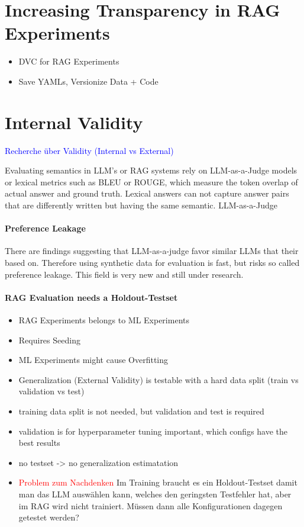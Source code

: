 \section{Increasing Transparency in RAG Experiments}

\begin{itemize}
    \item DVC for RAG Experiments
    \item Save YAMLs, Versionize Data + Code
\end{itemize}

\section{Internal Validity}

\textcolor{blue}{Recherche über Validity (Internal vs External)}


Evaluating semantics in LLM's or RAG systems rely on LLM-as-a-Judge models or lexical metrics such as BLEU or ROUGE, which measure the token overlap of actual answer and ground truth. Lexical answers can not capture answer pairs that are differently written but having the same semantic. LLM-as-a-Judge 

\paragraph{Preference Leakage}
There are findings suggesting that LLM-as-a-judge favor similar LLMs that their based on. Therefore using synthetic data for evaluation is fast, but risks so called preference leakage.\cite{Li.03.02.2025} This field is very new and still under research. 


\paragraph{RAG Evaluation needs a Holdout-Testset}
\begin{itemize}
    \item RAG Experiments belongs to ML Experiments 
    \item Requires Seeding
    \item ML Experiments might cause Overfitting
    \item Generalization (External Validity) is testable with a hard data split (train vs validation vs test)
    \item training data split is not needed, but validation and test is required
    \item validation is for hyperparameter tuning important, which configs have the best results
    \item no testset -> no generalization estimatation
    \item \textcolor{red}{Problem zum Nachdenken} Im Training braucht es ein Holdout-Testset damit man das LLM auswählen kann, welches den geringsten Testfehler hat, aber im RAG wird nicht trainiert. Müssen dann alle Konfigurationen dagegen getestet werden?
\end{itemize}

